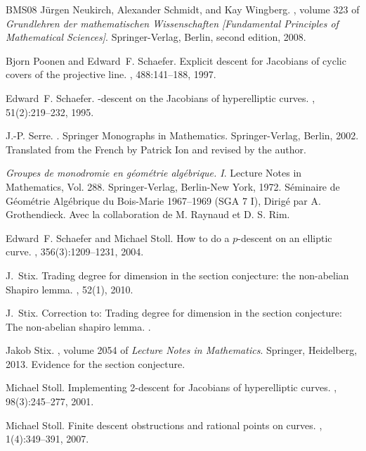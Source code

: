\documentclass[11pt]{amsart}
\theoremstyle{plain}
\theoremstyle{definition}
\begin{document}
\begin{thebibliography}{BMS{\etalchar{+}}08}
J\"{u}rgen Neukirch, Alexander Schmidt, and Kay Wingberg.
, volume 323 of {\em Grundlehren der mathematischen Wissenschaften [Fundamental Principles of Mathematical Sciences]}.
\newblock Springer-Verlag, Berlin, second edition, 2008.

Bjorn Poonen and Edward~F. Schaefer.
\newblock Explicit descent for {J}acobians of cyclic covers of the projective line.
, 488:141--188, 1997.

Edward~F. Schaefer.
-descent on the {J}acobians of hyperelliptic curves.
, 51(2):219--232, 1995.

J.-P. Serre.
.
\newblock Springer Monographs in Mathematics. Springer-Verlag, Berlin, 2002.
\newblock Translated from the French by Patrick Ion and revised by the author.

{\em Groupes de monodromie en g\'{e}om\'{e}trie alg\'{e}brique. {I}}.
\newblock Lecture Notes in Mathematics, Vol. 288. Springer-Verlag, Berlin-New York, 1972.
\newblock S\'{e}minaire de G\'{e}om\'{e}trie Alg\'{e}brique du Bois-Marie 1967--1969 (SGA 7 I), Dirig\'{e} par A. Grothendieck. Avec la collaboration de M. Raynaud et D. S. Rim.

Edward~F. Schaefer and Michael Stoll.
\newblock How to do a {$p$}-descent on an elliptic curve.
, 356(3):1209--1231, 2004.

J.~Stix.
\newblock Trading degree for dimension in the section conjecture: the non-abelian {S}hapiro lemma.
, 52(1), 2010.

J.~Stix.
\newblock Correction to: Trading degree for dimension in the section conjecture: The non-abelian shapiro lemma.
.

Jakob Stix.
, volume 2054 of {\em Lecture Notes in Mathematics}.
\newblock Springer, Heidelberg, 2013.
\newblock Evidence for the section conjecture.

Michael Stoll.
\newblock Implementing 2-descent for {J}acobians of hyperelliptic curves.
, 98(3):245--277, 2001.

Michael Stoll.
\newblock Finite descent obstructions and rational points on curves.
, 1(4):349--391, 2007.

\end{thebibliography}
\end{document}

